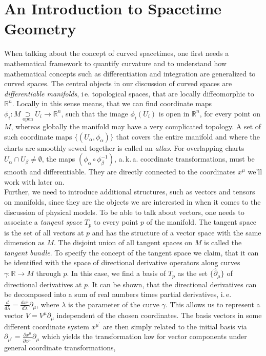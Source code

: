 \section{An Introduction to Spacetime Geometry}
 When talking about the concept of curved spacetimes, one first needs a mathematical framework to quantify curvature and to understand how mathematical concepts such as differentiation and integration are generalized to curved spaces. 
 The central objects in our discussion of curved spaces are \textit{differentiable manifolds}, i\,e. topological spaces, that are  locally diffeomorphic to $\mathbb{R}^n$. Locally in this sense means, that we can find coordinate maps $\phi_i: M \underset{\mathrm{open}}{\supset} U_i \rightarrow \mathbb{R}^n$, such that the image $\phi_i(U_i)$ is open in  $\mathbb{R}^n$, for every point on $M$, whereas globally the manifold may have a very complicated topology. A set of such coordinate maps $\{(U_{\alpha}, \phi_{\alpha})\}$ that covers the entire manifold and where the charts are smoothly sewed together is called an \textit{atlas}. For overlapping charts $U_{\alpha}\cap U_{\beta} \neq \emptyset$, the maps $(\phi_{\alpha} \circ \phi_{\beta}^{-1})$, a.\,k.\,a. coordinate transformations, must be smooth and differentiable. They are directly connected to the coordinates $x^{\mu}$ we'll work with later on. \\
Further, we need to introduce additional structures, such as vectors and tensors on manifolds, since they are the objects we are interested in when it comes to the discussion of physical models. To be able to talk about vectors, one needs to associate  a \textit{tangent space} $T_p$ to every point $p$ of the manifold. The tangent space is the set of all vectors at  $p$ and  has the structure of a vector space with the same dimension as $M$. The disjoint union of all tangent spaces on $M$ is called the \textit{tangent bundle}. To specify the concept of the tangent space we claim, that it can be identified with the space of directional derivative operators along curves $\gamma: \mathbb{R} \rightarrow M$  through $p$. In this case, we find a basis of $T_p$ as the set $\{\hat{\partial}_{\mu}\}$ of directional derivatives at $p$. It can be shown, that the directional derivatives can be decomposed into a sum of real numbers times partial derivatives, i.\,e. $\frac{d}{d \lambda} = \frac{d x^{\mu}}{d \lambda}\partial_{\mu}$, where $\lambda$ is the parameter of the curve $\gamma$. This allows us to represent a vector $V=V^{\mu}\partial_{\mu}$ independent of the chosen coordinates. The basis vectors in some different coordinate system $x^{\mu^{\prime}}$ are then simply related to the initial basis via $\partial_{\mu^{\prime}}=\frac{\partial x^{\mu}}{\partial x^{\mu^{\prime}}} \partial_{\mu}$ which yields the transformation law for vector components under general coordinate transformations,
